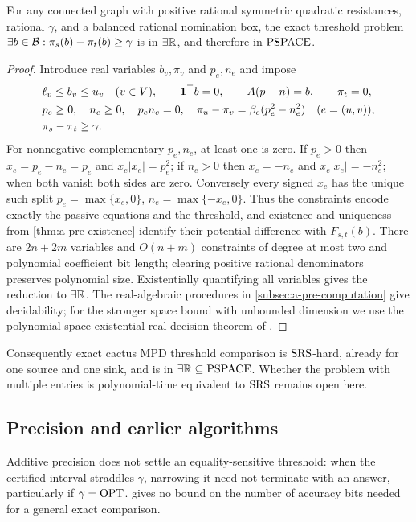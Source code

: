 \begin{proposition}
\label{prop:a-cac-etr}
For any connected graph with positive rational symmetric quadratic
resistances, rational $\gamma$, and a balanced rational nomination box,
the exact threshold problem
$\exists b\in\mathcal{B}:\pi_s(b)-\pi_t(b)\ge\gamma$ is in $\exists\mathbb{R}$, and
therefore in $\mathrm{PSPACE}$.
\end{proposition}
\begin{proof}
Introduce real variables $b_v,\pi_v$ and $p_e,n_e$ and impose
\begin{align*}
 &\ell_v\le b_v\le u_v\quad(v\in V),\qquad
 \mathbf{1}^\top b=0,\qquad A(p-n)=b,\qquad\pi_t=0,\\
 &p_e\ge0,\quad n_e\ge0,\quad p_en_e=0,\quad
 \pi_u-\pi_v=\beta_e(p_e^2-n_e^2)
       \quad(e=(u,v)),\\
 &\pi_s-\pi_t\ge\gamma.
\end{align*}
For nonnegative complementary $p_e,n_e$, at least one is zero.
If $p_e>0$ then $x_e=p_e-n_e=p_e$ and $x_e|x_e|=p_e^2$;
if $n_e>0$ then $x_e=-n_e$ and $x_e|x_e|=-n_e^2$; when both
vanish both sides are zero. Conversely every signed $x_e$ has the
unique such split $p_e=\max\{x_e,0\}$, $n_e=\max\{-x_e,0\}$.
Thus the constraints encode exactly the passive equations and the
threshold, and existence and uniqueness from \cref{thm:a-pre-existence}
identify their potential difference with $F_{s,t}(b)$.
There are $2n+2m$ variables and $O(n+m)$ constraints of degree at most
two and polynomial coefficient bit length; clearing positive rational
denominators preserves polynomial size. Existentially quantifying all
variables gives the reduction to $\exists\mathbb{R}$.
The real-algebraic procedures in \cref{subsec:a-pre-computation} give
decidability; for the stronger space bound with unbounded dimension
we use the polynomial-space existential-real decision theorem of
\citet[report version, Theorem 3.3]{canny1988-some-algebraic-and-geometric-computations}.
\end{proof}

Consequently exact cactus MPD threshold comparison is $\mathrm{SRS}$-hard,
already for one source and one sink, and is in $\exists\mathbb{R}\subseteq\mathrm{PSPACE}$.
Whether the problem with multiple entries is polynomial-time equivalent
to $\mathrm{SRS}$ remains open here.

\subsection{Precision and earlier algorithms}
\label{subsec:a-cac-discussion}
Additive precision does not settle an equality-sensitive threshold:
when the certified interval straddles $\gamma$, narrowing it need not
terminate with an answer, particularly if $\gamma=\mathrm{OPT}$.
 gives no bound on the number of accuracy bits
needed for a general exact comparison.

